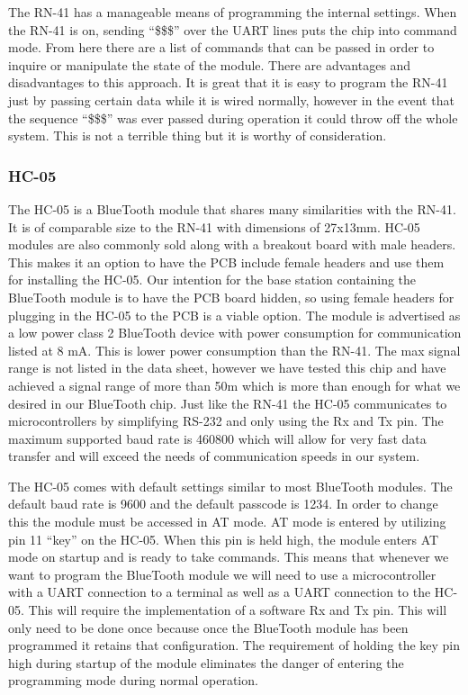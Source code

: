 The RN{}-41 has a manageable means of programming the internal settings. When
the RN{}-41 is on, sending {}``\$\$\$'' over the UART lines puts the chip into
command mode. From here there are a list of commands that can be passed in
order to inquire or manipulate the state of the module. There are advantages
and disadvantages to this approach. It is great that it is easy to program the
RN{}-41 just by passing certain data while it is wired normally, however in the
event that the sequence {}``\$\$\$'' was ever passed during operation it could
throw off the whole system. This is not a terrible thing but it is worthy of
consideration.

\subsubsection{HC-05}
\label{sec:bt-hc-05}
The HC{}-05 is a BlueTooth module that shares many similarities with the
RN{}-41. It is of comparable size to the RN{}-41 with dimensions of 27x13mm.
HC{}-05 modules are also commonly sold along with a breakout board with male
headers. This makes it an option to have the PCB include female headers and use
them for installing the HC{}-05. Our intention for the base station containing
the BlueTooth module is to have the PCB board hidden, so using female headers
for plugging in the HC{}-05 to the PCB is a viable option. The module is
advertised as a low power class 2 BlueTooth device with power consumption for
communication listed at 8 mA. This is lower power consumption than the RN{}-41.
The max signal range is not listed in the data sheet, however we have tested
this chip and have achieved a signal range of more than 50m which is more than
enough for what we desired in our BlueTooth chip. Just like the RN{}-41 the
HC{}-05 communicates to microcontrollers by simplifying RS{}-232 and only using
the Rx and Tx pin. The maximum supported baud rate is 460800 which will allow
for very fast data transfer and will exceed the needs of communication speeds
in our system.

The HC{}-05 comes with default settings similar to most BlueTooth modules. The
default baud rate is 9600 and the default passcode is 1234. In order to change
this the module must be accessed in AT mode. AT mode is entered by utilizing
pin 11 {}``key{}'' on the HC{}-05. When this pin is held high, the module
enters AT mode on startup and is ready to take commands. This means that
whenever we want to program the BlueTooth module we will need to use a
microcontroller with a UART connection to a terminal as well as a UART
connection to the HC{}-05. This will require the implementation of a software
Rx and Tx pin. This will only need to be done once because once the BlueTooth
module has been programmed it retains that configuration. The requirement of
holding the key pin high during startup of the module eliminates the danger of
entering the programming mode during normal operation.

